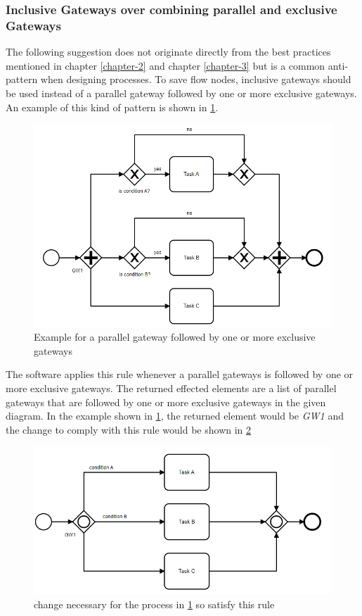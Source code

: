 \subsubsection{Inclusive Gateways over combining parallel and exclusive Gateways}\label{inc-sw}
The following suggestion does not originate directly from the best practices mentioned in chapter \ref{chapter-2} and chapter \ref{chapter-3} but is a common anti-pattern when designing processes.
To save flow nodes, inclusive gateways should be used instead of a parallel gateway followed by one or more exclusive gateways. An example of this kind of pattern is shown in \ref{fig:example-GW}.

\begin{figure}[H]
	\centering
	\includegraphics[width=0.9\columnwidth]{graphics/exclusive-suggestion-1}
	\caption{Example for a parallel gateway followed by one or more exclusive gateways} 
	\label{fig:example-GW} 
\end{figure}

The software applies this rule whenever a parallel gateways is followed by one or more exclusive gateways. The returned effected elements are a list of parallel gateways that are followed by one or more exclusive gateways in the given diagram. In the example shown in  \ref{fig:example-GW}, the returned element would be \textit{GW1} and the change to comply with this rule would be shown in \ref{fig:example-GW-fix}
\begin{figure}[H]
	\centering
	\includegraphics[width=0.9\columnwidth]{graphics/exclusive-suggestion-2}
	\caption{change necessary for the process in \ref{fig:example-GW} so satisfy this rule} 
	\label{fig:example-GW-fix} 
\end{figure}

